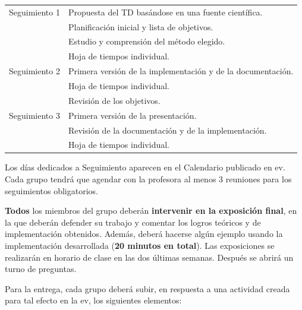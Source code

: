 \documentclass[a4paper]{article}
\theoremstyle{plain} %
\theoremstyle{plain} %
\begin{document}
    \begin{center}
    \begin{tabular}{|c||l|}
    \hline
  Seguimiento 1 & Propuesta del TD basándose en una fuente científica.   \\& Planificación inicial y lista de objetivos. \\
  & Estudio y comprensión del método elegido. \\
  & Hoja de tiempos individual.\\
\hline
Seguimiento 2  & Primera versión de la implementación y de la documentación. \\ &  Hoja de tiempos individual.\\& Revisión de los objetivos. \\
\hline
 Seguimiento 3  & Primera versión de la presentación.  \\& Revisión de la documentación  y de la  implementación.\\&  Hoja de tiempos individual.\\
\hline
    \end{tabular}
    \end{center}
Los días dedicados a Seguimiento aparecen en el Calendario publicado en ev. Cada grupo tendrá que agendar con la profesora al menos 3 reuniones para los seguimientos obligatorios.

\textbf{Todos} los miembros del grupo deberán \textbf{intervenir en la exposición final}, en la que deberán defender su trabajo y comentar los logros teóricos y de implementación obtenidos. Además, deberá hacerse algún ejemplo usando la implementación desarrollada (\textbf{20 minutos en total}). Las exposiciones se realizarán en horario de clase en las dos últimas semanas. Después se abrirá un turno de preguntas.

Para la entrega, cada grupo deberá subir, en respuesta a una actividad creada para tal efecto en la ev, los siguientes elementos:
\end{document}
